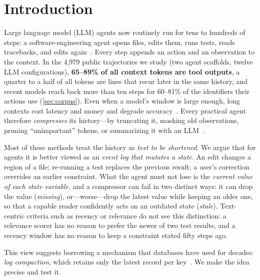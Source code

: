 \section{Introduction}
\label{sec:intro}

Large language model (LLM) agents now routinely run for tens to hundreds of
steps: a software-engineering agent opens files, edits them, runs tests, reads
tracebacks, and edits again~\citep{yang2024sweagent,wang2025openhands}. Every
step appends an action and an observation to the context. In the 4{,}979 public
trajectories we study (two agent scaffolds, twelve LLM configurations),
\textbf{65--89\% of all context tokens are tool outputs}, a quarter to a half of
all tokens are lines that recur later in the same history, and recent models
reach back more than ten steps for 60--81\% of the identifiers their actions
use (\cref{sec:corpus}). Even when a model's
window is large enough, long contexts cost latency and money and degrade
accuracy~\citep{liu2024lost,hsieh2024ruler,hong2025contextrot}. Every practical
agent therefore \emph{compresses} its history---by truncating it, masking old
observations, pruning ``unimportant'' tokens, or summarizing it with an
LLM~\citep{packer2023memgpt,lindenbauer2025complexity,kang2025acon,anthropic2025context}.

Most of these methods treat the history as \emph{text to be shortened}. We argue
that for agents it is better viewed as an \emph{event log that mutates a state}.
An edit changes a region of a file; re-running a test replaces the previous
result; a user's correction overrides an earlier constraint. What the agent
must not lose is the \emph{current value of each state variable}, and a
compressor can fail in two distinct ways: it can drop the value
(\emph{missing}), or---worse---drop the latest value while keeping an older one,
so that a capable reader confidently acts on an outdated state
(\emph{stale}). Text-centric criteria such as recency or relevance do not see
this distinction: a relevance scorer has no reason to prefer the newer of two
test results, and a recency window has no reason to keep a constraint stated
fifty steps ago.

This view suggests borrowing a mechanism that databases have used for decades:
\emph{log compaction}, which retains only the latest record per
key~\citep{kreps2011kafka,kleppmann2017ddia}. We make the idea precise and test
it.

